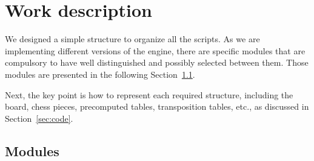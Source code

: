 \usepackage{amsmath}

\chapter{Work description}
\label{cap:descripcionTrabajo}

\newcommand{\ResultBar}[6][]{%
  \begingroup
  \pgfmathsetmacro{\TotalGames}{#4 + #5 + #6}%
  \pgfmathsetlengthmacro{\TotalWidth}{#2}%
  \pgfmathsetlengthmacro{\BarHeight}{#3}%
  \pgfmathsetlengthmacro{\WinWidth}{#4/\TotalGames*\TotalWidth}%
  \pgfmathsetlengthmacro{\DrawWidth}{#5/\TotalGames*\TotalWidth}%
  \pgfmathsetlengthmacro{\LossWidth}{#6/\TotalGames*\TotalWidth}%
  \begin{tikzpicture}[#1]
    \fill[green!70!black] (0,0) rectangle (\WinWidth,\BarHeight);
    \fill[gray] (\WinWidth,0) rectangle (\WinWidth+\DrawWidth,\BarHeight);
    \fill[red!70!black] (\WinWidth+\DrawWidth,0)
                       rectangle (\WinWidth+\DrawWidth+\LossWidth,\BarHeight);
    \draw (0,0) rectangle (\TotalWidth,\BarHeight);
    \node[font=\footnotesize] at (\WinWidth/2,1.4*\BarHeight)
      {\textbf{#4} wins};
    \node[font=\footnotesize] at (\WinWidth + \DrawWidth/2,1.4*\BarHeight)
      {\textbf{#5} draws};
    \node[font=\footnotesize] at (\WinWidth+\DrawWidth + \LossWidth/2,1.4*\BarHeight)
      {\textbf{#6} losses};
  \end{tikzpicture}%
  \endgroup
}

We designed a simple structure to organize all the scripts. As we are implementing different versions of the engine, there are specific modules that are compulsory to have well distinguished and possibly selected between them. Those modules are presented in the following Section~\ref{sec:modules}.

\vspace{1em}

\noindent Next, the key point is how to represent each required structure, including the board, chess pieces, precomputed tables, transposition tables, etc., as discussed in Section~\ref{sec:code}.

\section{Modules}
\label{sec:modules}

